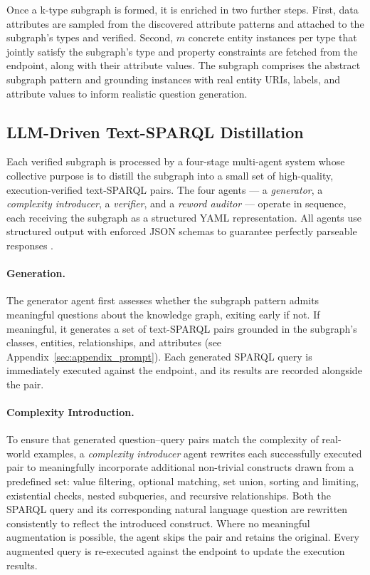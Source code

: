 Once a k-type subgraph is formed, it is enriched in two further steps. First, data attributes are sampled from the discovered attribute patterns and attached to the subgraph's types and verified. Second, $m$ concrete entity instances per type that jointly satisfy the subgraph's type and property constraints are fetched from the endpoint, along with their attribute values. The subgraph comprises the abstract subgraph pattern and grounding instances with real entity URIs, labels, and attribute values to inform realistic question generation.


\subsection{LLM-Driven Text-SPARQL Distillation}

Each verified subgraph is processed by a four-stage multi-agent system whose collective purpose is to distill the subgraph into a small set of high-quality, execution-verified text-SPARQL pairs. The four agents — a \textit{generator}, a \textit{complexity introducer}, a \textit{verifier}, and a \textit{reword auditor} — operate in sequence, each receiving the subgraph as a structured YAML representation. All agents use structured output with enforced JSON schemas to guarantee perfectly parseable responses \cite{openai2024structured}.

\paragraph{Generation.}
The generator agent first assesses whether the subgraph pattern admits meaningful questions about the knowledge graph, exiting early if not. If meaningful, it generates a set of text-SPARQL pairs grounded in the subgraph's classes, entities, relationships, and attributes (see Appendix~\ref{sec:appendix_prompt}). Each generated SPARQL query is immediately executed against the endpoint, and its results are recorded alongside the pair.

\paragraph{Complexity Introduction.}
To ensure that generated question–query pairs match the complexity of real-world examples, a
\textit{complexity introducer} agent rewrites each successfully executed pair to meaningfully incorporate
additional non-trivial constructs drawn from a predefined set: value filtering, optional matching,
set union, sorting and limiting, existential checks, nested subqueries, and recursive relationships. Both the SPARQL query and its corresponding natural language question are rewritten
consistently to reflect the introduced construct. Where no meaningful augmentation is possible,
the agent skips the pair and retains the original. Every augmented query is re-executed against
the endpoint to update the execution results.

